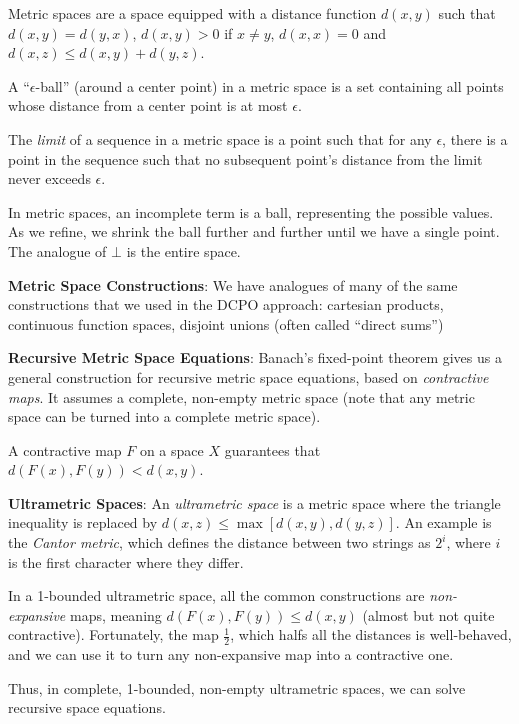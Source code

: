 \documentclass{article}
\begin{document}
Metric spaces are a space equipped with a distance function $d(x, y)$
such that $d(x, y) = d(y, x)$, $d(x, y) > 0$ if $x \neq y$, $d(x, x) =
0$ and $d(x, z) \leq d(x, y) + d(y, z)$.

A ``$\epsilon$-ball'' (around a center point) in a metric space is a
set containing all points whose distance from a center point is at
most $\epsilon$.

The \emph{limit} of a sequence in a metric space is a point such that
for any $\epsilon$, there is a point in the sequence such that no
subsequent point's distance from the limit never exceeds $\epsilon$.

In metric spaces, an incomplete term is a ball, representing the
possible values.  As we refine, we shrink the ball further and further
until we have a single point.  The analogue of $\bot$ is the entire
space.

\textbf{Metric Space Constructions}: We have analogues of many of the
same constructions that we used in the DCPO approach: cartesian
products, continuous function spaces, disjoint unions (often called
``direct sums'')

\textbf{Recursive Metric Space Equations}: Banach's fixed-point
theorem gives us a general construction for recursive metric space
equations, based on \emph{contractive maps}.  It assumes a complete,
non-empty metric space (note that any metric space can be turned into
a complete metric space).

A contractive map $F$ on a space $X$ guarantees that
$d(F(x), F(y)) < d(x, y)$.

\textbf{Ultrametric Spaces}: An \emph{ultrametric space} is a metric
space where the triangle inequality is replaced by
$d(x, z) \leq \max[d(x, y), d(y, z)]$.  An example is the \emph{Cantor
  metric}, which defines the distance between two strings as $2^i$,
where $i$ is the first character where they differ.

In a 1-bounded ultrametric space, all the common constructions are
\emph{non-expansive} maps, meaning $d(F(x), F(y)) \leq d(x, y)$
(almost but not quite contractive).  Fortunately, the map
$\frac{1}{2}$, which halfs all the distances is well-behaved, and we
can use it to turn any non-expansive map into a contractive one.

Thus, in complete, 1-bounded, non-empty ultrametric spaces, we can
solve recursive space equations.
\end{document}
